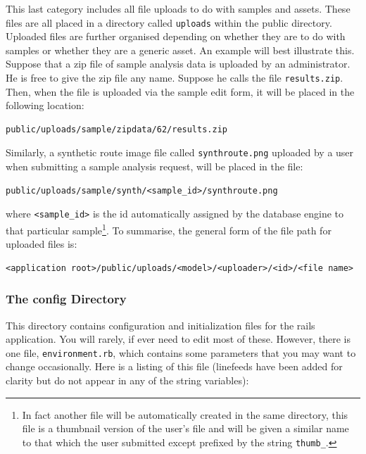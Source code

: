 \documentclass[12pt,twoside]{article}
\begin{document}
This last category includes all file
uploads to do with samples and assets. These files are all placed in
a directory called \verb=uploads= within the public directory.
Uploaded files are further organised depending on whether they are to
do with samples or whether they are a generic asset.
An example will best illustrate this. Suppose that a zip file of sample
analysis data is uploaded by an administrator. He is free to give the zip file
any name. Suppose he calls the file \verb=results.zip=. Then, when the file
is uploaded via the sample edit form, it will be placed in the
following location:
\begin{verbatim}
public/uploads/sample/zipdata/62/results.zip
\end{verbatim}

Similarly, a synthetic route image file called \verb=synthroute.png=
 uploaded by a user when submitting a 
sample analysis request, will be placed in the file:
\begin{verbatim}
public/uploads/sample/synth/<sample_id>/synthroute.png
\end{verbatim}
where \verb=<sample_id>= is the id automatically assigned by the database
engine to that particular sample\footnote{In fact another file will be
automatically created in the same directory, this file is a thumbnail
version of the user's file and will be given a similar name to that
which the user submitted except prefixed by the string \texttt{thumb\_}.}.
To summarise, the general form of the file path for uploaded files is:
\begin{verbatim}
<application root>/public/uploads/<model>/<uploader>/<id>/<file name>
\end{verbatim}

\subsubsection{The config Directory}\label{sec:parameters}
This directory contains configuration and initialization files
for the rails application. You will rarely, if ever need to edit most
of these. However, there is one file, \verb=environment.rb=, which
contains some parameters that you may want to change occasionally.
Here is a listing of this file (linefeeds have been added for clarity but
do not appear in any of the string variables):
\end{document}
